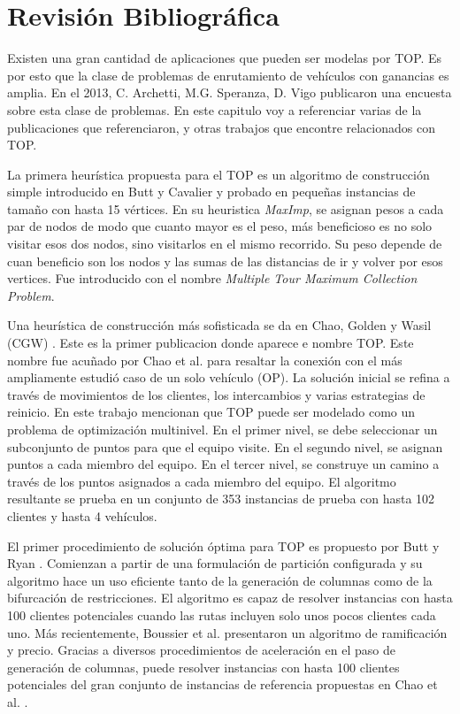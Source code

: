 

\chapter{Revisión Bibliográfica}

Existen una gran cantidad de aplicaciones que pueden ser modelas por TOP. Es por esto que la clase de problemas de enrutamiento de vehículos con ganancias es amplia. En el 2013, C. Archetti, M.G. Speranza, D. Vigo \cite{ArchettiSperanzaVigo} publicaron una encuesta sobre esta clase de problemas. En este capitulo voy a referenciar varias de la publicaciones que referenciaron, y otras trabajos que encontre relacionados con TOP.

\bigskip

La primera heurística propuesta para el TOP es un algoritmo de construcción simple introducido en Butt y Cavalier \cite{ButtCavalier} y probado en pequeñas instancias de tamaño con hasta 15 vértices. En su heuristica \textit{MaxImp}, se asignan pesos a cada par de nodos de modo que cuanto mayor es el peso, más beneficioso es no solo visitar esos dos nodos, sino visitarlos en el mismo recorrido. Su peso depende de cuan beneficio son los nodos y las sumas de las distancias de ir y volver por esos vertices. Fue introducido con el nombre \textit{Multiple Tour Maximum Collection Problem}.

\bigskip

Una heurística de construcción más sofisticada se da en Chao, Golden y Wasil (CGW) \cite{ChaoGoldenWasil}. Este es la primer publicacion donde aparece e nombre TOP. Este nombre fue acuñado por Chao et al. para resaltar la conexión con el más ampliamente estudió caso de un solo vehículo (OP). La solución inicial se refina a través de movimientos de los clientes, los intercambios y varias estrategias de reinicio. En este trabajo mencionan que TOP puede ser modelado como un problema de optimización multinivel. En el primer nivel, se debe seleccionar un subconjunto de puntos para que el equipo visite. En el segundo nivel, se asignan puntos a cada miembro del equipo. En el tercer nivel, se construye un camino a través de los puntos asignados a cada miembro del equipo. El algoritmo resultante se prueba en un conjunto de 353 instancias de prueba con hasta 102 clientes y hasta 4 vehículos.

\bigskip

El primer procedimiento de solución óptima para TOP es propuesto por Butt y Ryan \cite{ButtRyan}. Comienzan a partir de una formulación de partición configurada y su algoritmo hace un uso eficiente tanto de la generación de columnas como de la bifurcación de restricciones. El algoritmo es capaz de resolver instancias con hasta 100 clientes potenciales cuando las rutas incluyen solo unos pocos clientes cada uno. Más recientemente, Boussier et al. \cite{BoussierFeilletGendreau} presentaron un algoritmo de ramificación y precio. Gracias a diversos procedimientos de aceleración en el paso de generación de columnas, puede resolver instancias con hasta 100 clientes potenciales del gran conjunto de instancias de referencia propuestas en Chao et al. \cite{ChaoGoldenWasil}.

